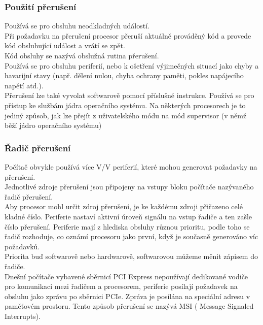 \subsubsection*{Použití přerušení}
Používá se pro obsluhu neodkladných událostí. \\
Při požadavku na přerušení procesor přeruší aktuálně prováděný kód a provede kód obsluhující událost a vrátí se zpět.\\
Kód obsluhy se nazývá obslužná rutina přerušení.\\
Používá se pro obsluhu periferií, nebo k ošetření výjimečných situací jako chyby a havarijní stavy (např. dělení nulou, chyba ochrany paměti, pokles napájecího napětí atd.).\\
Přerušení lze také vyvolat softwarově pomocí příslušné instrukce. Používá se pro přístup ke službám jádra operačního systému. Na některých procesorech je to jediný způsob, jak lze přejít z uživatelského módu na mód supervisor (v němž běží jádro operačního systému)

\subsubsection*{Řadič přerušení}
Počítač obvykle používá více V/V periferií, které mohou generovat požadavky na přerušení.\\
Jednotlivé zdroje přerušení jsou připojeny na vstupy bloku počítače nazývaného řadič přerušení.\\
Aby procesor mohl určit zdroj přerušení, je ke každému zdroji přiřazeno celé kladné číslo. Periferie nastaví aktivní úroveň signálu na vstup řadiče a ten zašle číslo přerušení. Periferie mají z hlediska obsluhy různou prioritu, podle toho se řadič rozhoduje, co oznámí procesoru jako první, když je současně generováno víc požadavků.\\
Priorita buď softwarově nebo hardwarově, softwarovou můžeme měnit zápisem do řadiče.\\
Dnešní počítače vybavené sběrnicí PCI Express nepoužívají dedikované vodiče pro komunikaci mezi řadičem a procesorem, periferie posílají požadavek na obsluhu jako zprávu po sběrnici PCIe. Zpráva je posílána na speciální adresu v paměťovém prostoru. Tento způsob přerušení se nazývá MSI ( Message Signaled Interrupts).


